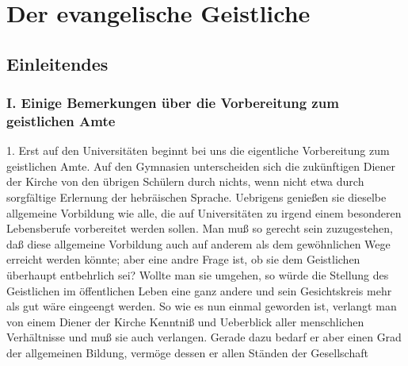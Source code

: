 
\part{Der evangelische Geistliche}
\chapter{Einleitendes}

\section[I. Vorbereitung zum geistlichen Amte]{I. Einige Bemerkungen über die Vorbereitung zum geistlichen Amte}

1. Erst auf den Universitäten beginnt bei uns die eigentliche Vorbereitung zum geistlichen Amte. Auf den Gymnasien unterscheiden sich die zukünftigen Diener der Kirche von den übrigen Schülern durch nichts, wenn nicht etwa durch sorgfältige Erlernung der hebräischen Sprache. Uebrigens genießen sie dieselbe allgemeine Vorbildung wie alle, die auf Universitäten zu irgend einem besonderen Lebensberufe vorbereitet werden sollen. Man muß so gerecht sein zuzugestehen, daß diese allgemeine Vorbildung auch auf anderem als dem gewöhnlichen Wege erreicht werden könnte; aber eine andre Frage ist, ob sie dem Geistlichen überhaupt entbehrlich sei? Wollte man sie umgehen, so würde die Stellung des Geistlichen im öffentlichen Leben eine ganz andere und sein Gesichtskreis mehr als gut wäre eingeengt werden. So wie es nun einmal geworden ist, verlangt man von einem Diener der Kirche Kenntniß und Ueberblick aller menschlichen Verhältnisse und muß sie auch verlangen. Gerade dazu bedarf er aber einen Grad der allgemeinen Bildung, vermöge dessen er allen Ständen der Gesellschaft
